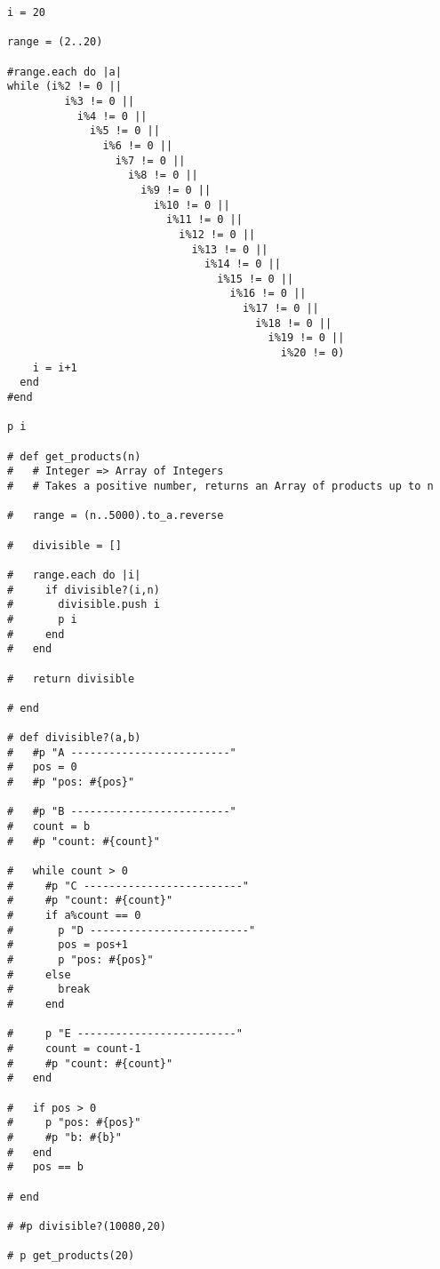 \documentclass[11pt]{article}
\begin{document}
\begin{verbatim}
i = 20

range = (2..20)

#range.each do |a|
while (i%2 != 0 ||
         i%3 != 0 ||
           i%4 != 0 ||
             i%5 != 0 ||
               i%6 != 0 ||
                 i%7 != 0 ||
                   i%8 != 0 ||
                     i%9 != 0 ||
                       i%10 != 0 ||
                         i%11 != 0 ||
                           i%12 != 0 ||
                             i%13 != 0 ||
                               i%14 != 0 ||
                                 i%15 != 0 ||
                                   i%16 != 0 ||
                                     i%17 != 0 ||
                                       i%18 != 0 ||
                                         i%19 != 0 ||
                                           i%20 != 0) 
    i = i+1
  end
#end

p i

# def get_products(n)
#   # Integer => Array of Integers
#   # Takes a positive number, returns an Array of products up to n

#   range = (n..5000).to_a.reverse

#   divisible = []

#   range.each do |i|
#     if divisible?(i,n)
#       divisible.push i
#       p i
#     end
#   end

#   return divisible

# end

# def divisible?(a,b)
#   #p "A -------------------------"
#   pos = 0
#   #p "pos: #{pos}"

#   #p "B -------------------------"
#   count = b
#   #p "count: #{count}"

#   while count > 0
#     #p "C -------------------------"
#     #p "count: #{count}"
#     if a%count == 0
#       p "D -------------------------"
#       pos = pos+1
#       p "pos: #{pos}"
#     else
#       break
#     end

#     p "E -------------------------"
#     count = count-1
#     #p "count: #{count}"
#   end

#   if pos > 0
#     p "pos: #{pos}"
#     #p "b: #{b}"
#   end
#   pos == b

# end

# #p divisible?(10080,20)

# p get_products(20)
\end{verbatim}
\end{document}
